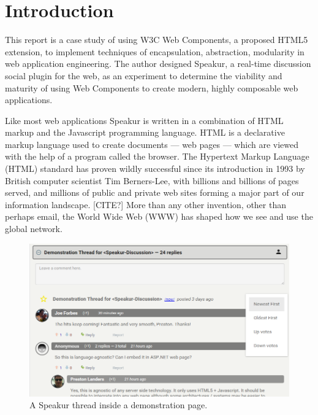 \chapter{Introduction}
%

%
%

This report is a case study of using W3C Web Components, 
a proposed HTML5 extension,
to implement techniques of encapsulation, abstraction, modularity in web application engineering.
The author designed Speakur, a real-time discussion social plugin for the web, 
as an experiment to determine the viability and maturity of using Web Components to create modern, highly composable web applications.

Like most web applications Speakur is written in a combination of HTML markup and the Java\-script programming language. 
HTML is a declarative markup language used to create documents --- web pages --- which are viewed with the help of a program called the browser. 
The Hyper\-text Markup Language (HTML) 
standard has proven wildly successful since its introduction in 1993 by British computer scientist 
Tim Berners-Lee, 
with billions and billions of pages served, 
and millions of public and private web sites forming a major part of our information landscape. [CITE?]
More than any other invention, other than perhaps email, the World Wide Web (WWW) has shaped how we see and use the global network.

% 
\begin{figure}[htb]
\centering
 \includegraphics[width=6in]{images/screenshot_20150312_1630_v2.png}
\caption{A Speakur thread inside a demonstration page.}
\label{f:demo1}
\end{figure}
%

